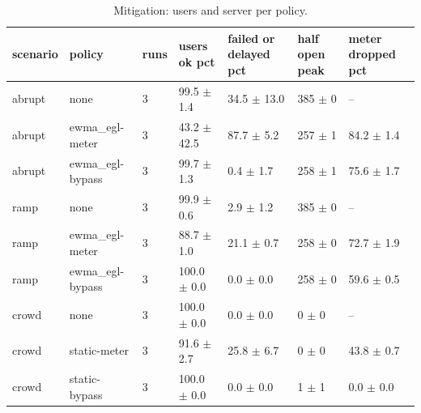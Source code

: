 \begin{table}[t]
\centering\small
\caption{Mitigation: users and server per policy.}\label{tab:mitigation}
\begin{tabular}{lllllll}
\toprule
scenario & policy & runs & users ok pct & failed or delayed pct & half open peak & meter dropped pct \\
\midrule
abrupt & none & 3 & 99.5 $\pm$ 1.4 & 34.5 $\pm$ 13.0 & 385 $\pm$ 0 & -- \\
abrupt & ewma\_egl-meter & 3 & 43.2 $\pm$ 42.5 & 87.7 $\pm$ 5.2 & 257 $\pm$ 1 & 84.2 $\pm$ 1.4 \\
abrupt & ewma\_egl-bypass & 3 & 99.7 $\pm$ 1.3 & 0.4 $\pm$ 1.7 & 258 $\pm$ 1 & 75.6 $\pm$ 1.7 \\
ramp & none & 3 & 99.9 $\pm$ 0.6 & 2.9 $\pm$ 1.2 & 385 $\pm$ 0 & -- \\
ramp & ewma\_egl-meter & 3 & 88.7 $\pm$ 1.0 & 21.1 $\pm$ 0.7 & 258 $\pm$ 0 & 72.7 $\pm$ 1.9 \\
ramp & ewma\_egl-bypass & 3 & 100.0 $\pm$ 0.0 & 0.0 $\pm$ 0.0 & 258 $\pm$ 0 & 59.6 $\pm$ 0.5 \\
crowd & none & 3 & 100.0 $\pm$ 0.0 & 0.0 $\pm$ 0.0 & 0 $\pm$ 0 & -- \\
crowd & static-meter & 3 & 91.6 $\pm$ 2.7 & 25.8 $\pm$ 6.7 & 0 $\pm$ 0 & 43.8 $\pm$ 0.7 \\
crowd & static-bypass & 3 & 100.0 $\pm$ 0.0 & 0.0 $\pm$ 0.0 & 1 $\pm$ 1 & 0.0 $\pm$ 0.0 \\
\bottomrule
\end{tabular}
\end{table}
